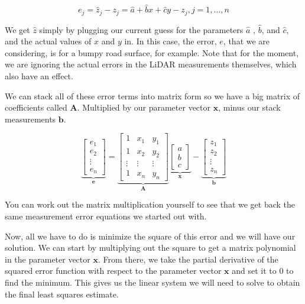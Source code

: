 \begin{equation}
e_j = \hat{z}_j - z_j  = \hat{a} + \hat{b}x + \hat{c}y - z_j, j=1, \ldots, n
\end{equation}


We get $\hat{z}$ simply by plugging our
current guess for the parameters $\hat{a}$ , $\hat{b}$, and $\hat{c}$, and
the actual values of $x$ and $y$ in. In this case, the error, $e$, that we are
considering, is for a bumpy road surface, for example.  Note that for the moment, we are ignoring the actual
errors in the LiDAR measurements themselves, which also have an effect. 


We can stack all of these error terms into matrix form so we have a big matrix of
coefficients called $\mathbf{A}$. Multiplied by our parameter vector $\mathbf{x}$,
minus our stack measurements $\mathbf{b}$. 

\begin{equation}
\underbrace{\begin{bmatrix}
e_1 \\
e_2 \\
\vdots \\
e_n
\end{bmatrix}}_{\mathbf{e}} = 
\underbrace{\begin{bmatrix}
1 & x_1 & y_1 \\
1 & x_2 & y_2 \\
\vdots & \vdots & \vdots \\
1 & x_n & y_n
\end{bmatrix}}_{\mathbf{A}}
\underbrace{\begin{bmatrix}
a \\
b \\
c
\end{bmatrix}}_{\mathbf{x}} -
\underbrace{\begin{bmatrix}
z_1 \\
z_2 \\
\vdots \\
z_n
\end{bmatrix}}_{\mathbf{b}}
\end{equation}


You can work out the matrix multiplication yourself to see that we get back the same measurement error
equations we started out with. 

Now, all we have to do is minimize
the square of this error and we will have our solution. We can start by multiplying out
the square to get a matrix polynomial in the parameter vector $\mathbf{x}$. From there, we take the partial derivative
of the squared error function with respect to the parameter vector $\mathbf{x}$ and
set it to 0 to find the minimum. This gives us the linear system we will
need to solve to obtain the final least squares estimate. 

